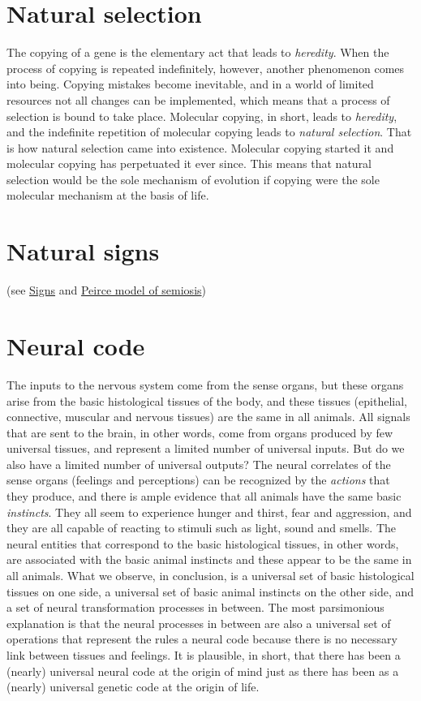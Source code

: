 \documentclass[12pt]{article}
\begin{document}
\section{Natural selection}
The copying of a gene is the elementary act that leads to \textit{heredity}. When the process of copying is repeated indefinitely, however, another phenomenon comes into being. Copying mistakes become inevitable, and in a world of limited resources not all changes can be implemented, which means that a process of selection is bound to take place. Molecular copying, in short, leads to \textit{heredity}, and the indefinite repetition of molecular copying leads to \textit{natural selection}. That is how natural selection came into existence. Molecular copying started it and molecular copying has perpetuated it ever since. This means that natural selection would be the sole mechanism of evolution if copying were the sole molecular mechanism at the basis of life. 


\section{Natural signs} (see \hyperlink{signs}{Signs} and \hyperlink{peirce_model_of_semiosis}{Peirce model of semiosis}) 


\section{Neural code}
The inputs to the nervous system come from the sense organs, but these organs arise from the basic histological tissues of the body, and these tissues (epithelial, connective, muscular and nervous tissues) are the same in all animals. All signals that are sent to the brain, in other words, come from organs produced by few universal tissues, and represent a limited number of universal inputs. But do we also have a limited number of universal outputs? The neural correlates of the sense organs (feelings and perceptions) can be recognized by the \textit{actions} that they produce, and there is ample evidence that all animals have the same basic \textit{instincts}. They all seem to experience hunger and thirst, fear and aggression, and they are all capable of reacting to stimuli such as light, sound and smells. The neural entities that correspond to the basic histological tissues, in other words, are associated with the basic animal instincts and these appear to be the same in all animals. What we observe, in conclusion, is a universal set of basic histological tissues on one side, a universal set of basic animal instincts on the other side, and a set of neural transformation processes in between. The most parsimonious explanation is that the neural processes in between are also a universal set of operations that represent the rules a neural code because there is no necessary link between tissues and feelings. It is plausible, in short, that there has been a (nearly) universal neural code at the origin of mind just as there has been as a (nearly) universal genetic code at the origin of life. 
\end{document}

